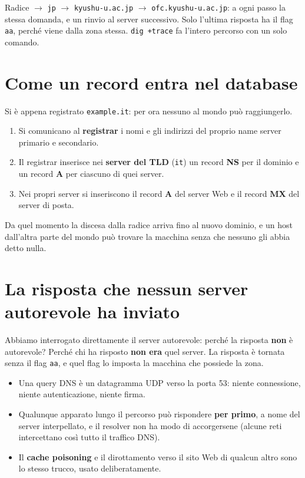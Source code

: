 Radice $\rightarrow$ \texttt{jp} $\rightarrow$ \texttt{kyushu-u.ac.jp} $\rightarrow$ \texttt{ofc.kyushu-u.ac.jp}: a ogni
passo la stessa domanda, e un rinvio al server successivo. Solo l'ultima risposta ha il flag \texttt{aa}, perché
viene dalla zona stessa. \texttt{dig +trace} fa l'intero percorso con un solo comando.

\section{Come un record entra nel database}

Si è appena registrato \texttt{example.it}: per ora nessuno al mondo può raggiungerlo.

\begin{enumerate}
    \item Si comunicano al \textbf{registrar} i nomi e gli indirizzi del proprio name server primario e secondario.
    \item Il registrar inserisce nei \textbf{server del TLD} (\texttt{it}) un record \textbf{NS} per il dominio e un
          record \textbf{A} per ciascuno di quei server.
    \item Nei propri server si inseriscono il record \textbf{A} del server Web e il record \textbf{MX} del server di
          posta.
\end{enumerate}

Da quel momento la discesa dalla radice arriva fino al nuovo dominio, e un host dall'altra parte del mondo può
trovare la macchina senza che nessuno gli abbia detto nulla.

\section{La risposta che nessun server autorevole ha inviato}

Abbiamo interrogato direttamente il server autorevole: perché la risposta \textbf{non} è autorevole? Perché chi ha
risposto \textbf{non era} quel server. La risposta è tornata senza il flag \texttt{aa}, e quel flag lo imposta la
macchina che possiede la zona.

\begin{itemize}
    \item Una query DNS è un datagramma UDP verso la porta 53: niente connessione, niente autenticazione, niente
          firma.
    \item Qualunque apparato lungo il percorso può rispondere \textbf{per primo}, a nome del server interpellato, e il
          resolver non ha modo di accorgersene (alcune reti intercettano così tutto il traffico DNS).
    \item Il \textbf{cache poisoning} e il dirottamento verso il sito Web di qualcun altro sono lo stesso trucco,
          usato deliberatamente.
\end{itemize}

